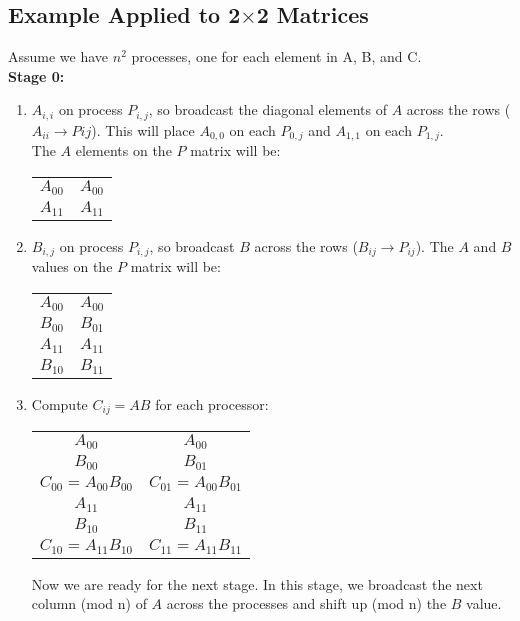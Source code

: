 \documentclass[]{scrartcl}
\begin{document}
\subsection{Example Applied to 2$\times$2 Matrices}
Assume we have $n^{2}$ processes, one for each element in A, B, and C. \\
\textbf{Stage 0:}
\begin{enumerate}
	\item $A_{i,i}$ on process $P_{i,j}$, so broadcast the diagonal elements of $A$ across the rows ($A_{ii}\rightarrow P{ij}$). This will place $A_{0,0}$ on each $P_{0,j}$ and $A_{1,1}$ on each $P_{1,j}$. \\
	The $A$ elements on the $P$ matrix will be:
	\begin{center}
		\begin{tabular}{|c|c|} 
			\hline
			$A_{00}$ & $A_{00}$ \\
			$A_{11}$ & $A_{11}$ \\
			\hline
		\end{tabular}
	\end{center}
	\item $B_{i,j}$ on process $P_{i,j}$, so broadcast $B$ across the rows ($B_{ij}\rightarrow P_{ij}$). The $A$ and $B$ values on the $P$ matrix will be:
	\begin{center}
		\begin{tabular}{|c|c|} 
			\hline
			$A_{00}$ & $A_{00}$ \\
			$B_{00}$ & $B_{01}$ \\
			$A_{11}$ & $A_{11}$ \\
			$B_{10}$ & $B_{11}$ \\
			\hline
		\end{tabular}
	\end{center}
	\item Compute $C_{ij}=AB$ for each processor:
	\begin{center}
		\begin{tabular}{|c|c|} 
			\hline
			$A_{00}$ 			  & $A_{00}$ \\
			$B_{00}$   			  & $B_{01}$ \\
			$C_{00}=A_{00}B_{00}$ & $C_{01}=A_{00}B_{01}$ \\
			$A_{11}$              & $A_{11}$ \\
			$B_{10}$     		  & $B_{11}$ \\
			$C_{10}=A_{11}B_{10}$ & $C_{11}=A_{11}B_{11}$ \\
			\hline
		\end{tabular}
	\end{center}
	Now we are ready for the next stage. In this stage, we broadcast the next column (mod n) of $A$ across the processes and shift up (mod n) the $B$ value.
\end{enumerate}
\end{document}
